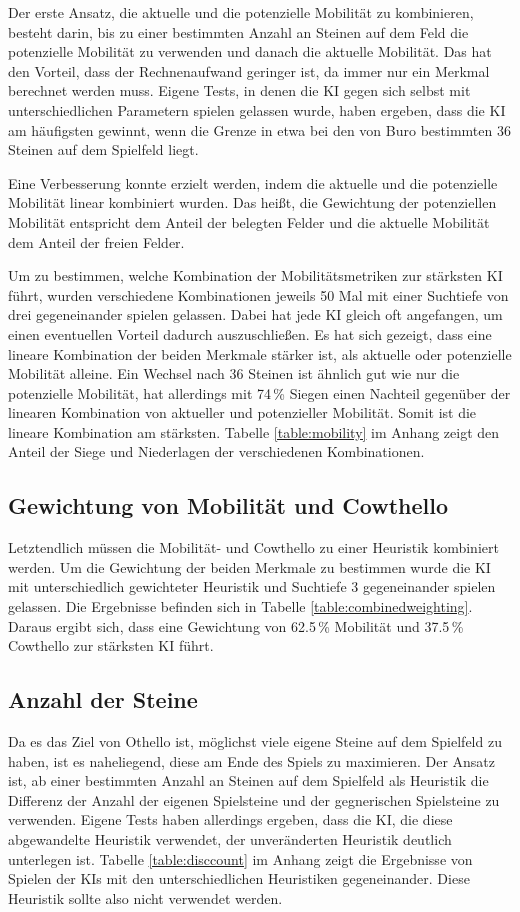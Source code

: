 Der erste Ansatz, die aktuelle und die potenzielle Mobilität zu kombinieren, besteht darin, bis zu einer bestimmten
Anzahl an Steinen auf dem Feld die potenzielle Mobilität zu verwenden und danach die aktuelle Mobilität. Das hat den
Vorteil, dass der Rechnenaufwand geringer ist, da immer nur ein Merkmal berechnet werden muss. Eigene Tests, in denen die \ac{KI}
gegen sich selbst mit unterschiedlichen Parametern spielen gelassen wurde, haben ergeben, dass die \ac{KI} am häufigsten
gewinnt, wenn die Grenze in etwa bei den von Buro bestimmten 36 Steinen auf dem Spielfeld liegt.

Eine Verbesserung konnte erzielt werden, indem die aktuelle und die potenzielle Mobilität linear kombiniert wurden.
Das heißt, die Gewichtung der potenziellen Mobilität entspricht dem Anteil der belegten Felder und die aktuelle Mobilität
dem Anteil der freien Felder.

Um zu bestimmen, welche Kombination der Mobilitätsmetriken zur stärksten \ac{KI} führt, wurden verschiedene
Kombinationen jeweils 50 Mal mit einer Suchtiefe von drei gegeneinander spielen gelassen. Dabei hat jede \ac{KI} gleich
oft angefangen, um einen eventuellen Vorteil dadurch auszuschließen. Es hat sich gezeigt, dass eine lineare Kombination
der beiden Merkmale stärker ist, als aktuelle oder potenzielle Mobilität alleine. Ein Wechsel nach 36 Steinen ist ähnlich gut wie nur die potenzielle Mobilität, hat allerdings mit 74\,\% Siegen einen
Nachteil gegenüber der linearen Kombination von aktueller
und potenzieller Mobilität. Somit ist die lineare Kombination am stärksten. Tabelle \ref{table:mobility} im
Anhang zeigt den Anteil der Siege und Niederlagen der verschiedenen Kombinationen.

\subsection{Gewichtung von Mobilität und Cowthello} \label{sec:mobcowweight}
Letztendlich müssen die Mobilität- und Cowthello zu einer Heuristik kombiniert werden. Um die Gewichtung der beiden
Merkmale zu bestimmen wurde die \ac{KI} mit unterschiedlich gewichteter Heuristik und Suchtiefe 3 gegeneinander spielen
gelassen. Die Ergebnisse befinden sich in Tabelle \ref{table:combinedweighting}. Daraus ergibt sich, dass eine
Gewichtung von 62.5\,\% Mobilität und 37.5\,\% Cowthello zur stärksten \ac{KI} führt.

\subsection{Anzahl der Steine}
Da es das Ziel von Othello ist, möglichst viele eigene Steine auf dem Spielfeld zu haben, ist es naheliegend, diese am
Ende des Spiels zu maximieren. Der Ansatz ist, ab einer bestimmten Anzahl an Steinen auf dem Spielfeld als Heuristik die
Differenz der Anzahl der eigenen Spielsteine und der gegnerischen Spielsteine zu verwenden. Eigene Tests haben allerdings
ergeben, dass die \ac{KI}, die diese abgewandelte Heuristik verwendet, der unveränderten Heuristik deutlich unterlegen ist.
Tabelle \ref{table:disccount} im Anhang zeigt die Ergebnisse von Spielen der \acp{KI} mit den unterschiedlichen Heuristiken
gegeneinander. Diese Heuristik sollte also nicht verwendet werden.
